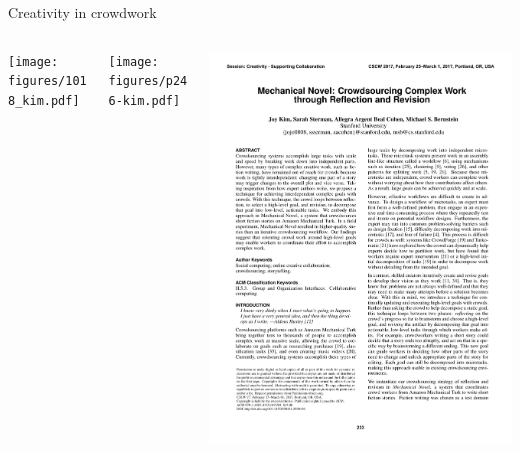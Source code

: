 \documentclass[presentation]{subfiles}
\begin{document}
\begin{frame}{Creativity in crowdwork}
  \begin{columns}[T]
    \begin{column}{0.33\textwidth}
      \centering
      \texttt{[image: figures/1018\_kim.pdf]}
    \end{column}
    \begin{column}{0.33\textwidth}
      \centering
      \texttt{[image: figures/p246-kim.pdf]}
    \end{column}
    \begin{column}{0.33\textwidth}
      \centering
      \includegraphics[max width=\linewidth,keepaspectratio]{figures/p233-kim.pdf}
    \end{column}
  \end{columns}
\end{frame}
\end{document}
